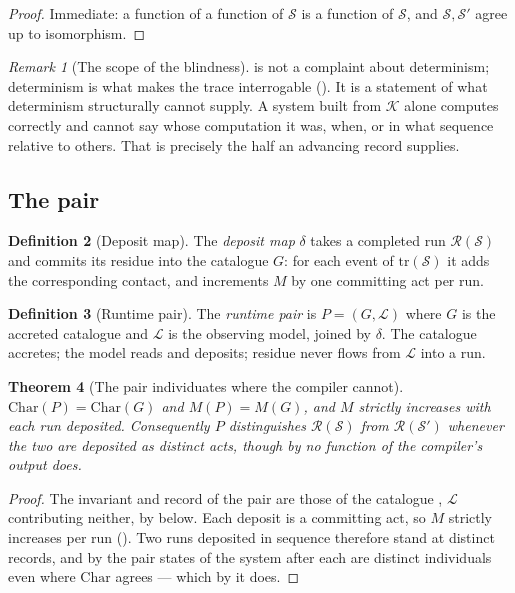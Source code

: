 \documentclass[twocolumn,11pt,a4paper]{article}
\theoremstyle{sup}
\newtheorem{theorem}{Theorem}[section]
\theoremstyle{definition}
\newtheorem{definition}[theorem]{Definition}
\theoremstyle{remark}
\newtheorem{remark}[theorem]{Remark}
\newcommand{\rec}{M}
\newcommand{\Char}{\mathrm{Char}}
\newcommand{\Src}{\mathcal{S}}
\newcommand{\Cmp}{\mathcal{K}}
\newcommand{\Mod}{\mathcal{L}}
\newcommand{\Run}{\mathcal{R}}
\newcommand{\Tr}{\mathrm{tr}}
\newcommand{\dep}{\delta}
\begin{document}
\begin{proof}
Immediate: a function of a function of $\Src$ is a function of $\Src$, and
$\Src,\Src'$ agree up to isomorphism.
\end{proof}

\begin{remark}[The scope of the blindness]
\label{rem:blind-scope}
 is not a complaint about determinism; determinism is
what makes the trace interrogable (). It is a statement of
what determinism structurally cannot supply. A system built from $\Cmp$ alone
computes correctly and cannot say whose computation it was, when, or in what
sequence relative to others. That is precisely the half an advancing record
supplies.
\end{remark}

\subsection{The pair}

\begin{definition}[Deposit map]
\label{def:deposit}
The \emph{deposit map} $\dep$ takes a completed run $\Run(\Src)$ and commits
its residue into the catalogue $G$: for each event of $\Tr(\Src)$ it adds the
corresponding contact, and increments $\rec$ by one committing act per run.
\end{definition}

\begin{definition}[Runtime pair]
\label{def:pair}
The \emph{runtime pair} is $P=(G,\Mod)$ where $G$ is the accreted catalogue and
$\Mod$ is the observing model, joined by $\dep$. The catalogue accretes; the
model reads and deposits; residue never flows from $\Mod$ into a run.
\end{definition}

\begin{theorem}[The pair individuates where the compiler cannot]
\label{thm:pair-individuates}
$\Char(P)=\Char(G)$ and $\rec(P)=\rec(G)$, and $\rec$ strictly increases with
each run deposited. Consequently $P$ distinguishes $\Run(\Src)$ from
$\Run(\Src')$ whenever the two are deposited as distinct acts, though by
 no function of the compiler's output does.
\end{theorem}

\begin{proof}
The invariant and record of the pair are those of the catalogue
\citep[Thm.~11.4]{sachikonye2025directional}, $\Mod$ contributing neither, by
 below. Each deposit is a committing act, so
$\rec$ strictly increases per run (). Two runs deposited in
sequence therefore stand at distinct records, and by
 the pair states of the system after each are
distinct individuals even where $\Char$ agrees --- which by
 it does.
\end{proof}
\end{document}
